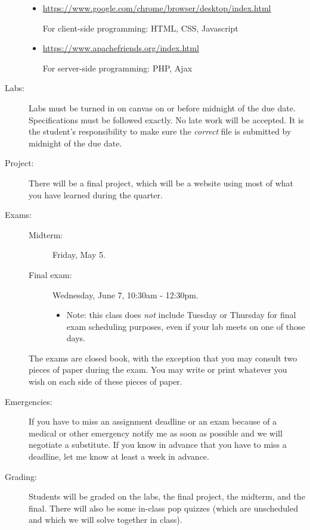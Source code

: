 \documentclass{article}
\begin{document}
\begin{description}
  \begin{itemize}
  \item \url{https://www.google.com/chrome/browser/desktop/index.html}

    For client-side programming: HTML, CSS, Javascript
  \item\url{https://www.apachefriends.org/index.html}

    For server-side programming: PHP, Ajax
  \end{itemize}

\item[Labs:] Labs must be turned in on canvas on or before midnight of
  the due date.  Specifications must be followed exactly.  No late
  work will be accepted.  It is the student's responsibility to make
  sure the {\em correct} file is submitted by midnight of the due
  date.

\item[Project:]  There will be a final project, which will be a
  website using most of what you have learned during the quarter.

\item[Exams:]\mbox{}
  
  \begin{description}
  \item[Midterm:]  Friday, May 5.
  \item[Final exam:] Wednesday, June 7, 10:30am - 12:30pm.
    \begin{itemize}
      \item Note:  this class does {\em not} include Tuesday or
        Thursday for final exam scheduling purposes,
        even if your lab meets on one of those days.
    \end{itemize}
  \end{description}
  
  The  exams are closed book, with the exception that you may consult
  two pieces of paper during the exam.  You may write or print whatever
  you wish on each side of these pieces of paper.

\item[Emergencies:] If you have to miss an assignment deadline or an
  exam because of a medical or other emergency notify me as soon as
  possible and we will negotiate a substitute.  If you know in advance
  that you have to miss a deadline, let me know at least a week in
  advance.

\item[Grading:] Students will be graded on the labs, the final
  project, the midterm, and the final.  There will also be
  some in-class pop quizzes (which are
  unscheduled and which we will solve together in class).


\end{description}
\end{document}
